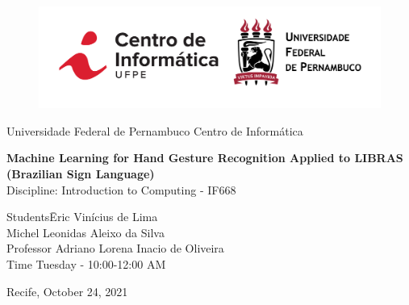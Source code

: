 \documentclass[a4paper, 12pt]{article}
\begin{document}
\begin{titlepage}
	\begin{center}

\vspace{10pt}
\begin{figure}[!ht]
\centering
\includegraphics[scale=0.2]{img/logo_university.png}
\end{figure}


\huge{Universidade Federal de Pernambuco}
\huge{Centro de Informática}

        
        \vspace{85pt}
        
		\textbf{\LARGE{Machine Learning for Hand Gesture Recognition Applied to LIBRAS (Brazilian Sign Language)}}\\
		\vspace{35pt}
		\large{Discipline: Introduction to Computing - IF668\cite{course}}
		\vspace{80pt}
		
	\end{center}
	
	\begin{flushleft}
		\begin{tabbing}
			Students\qquad\qquad\= Eric Vinícius de Lima\cite{eric}\\
			\>Michel Leonidas Aleixo da Silva\cite{michel}\\
			Professor\> Adriano Lorena Inacio de Oliveira\cite{adriano} \\
			Time\> Tuesday - 10:00-12:00 AM\\
		
	\end{tabbing}
		  
	\end{flushleft}
	
	\begin{center}
		\vspace{25pt}
		Recife, October 24, 2021
	\end{center}
\end{titlepage}

\newpage
\tableofcontents
\thispagestyle{empty}
\end{document}

